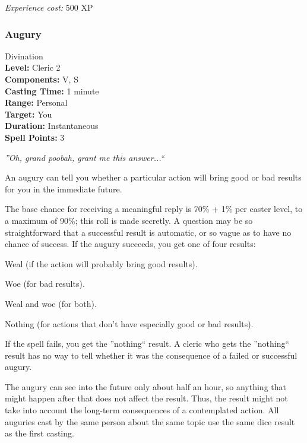 \emph{Experience cost:} 500 XP
\subsubsection{Augury}
\label{Spell:Augury}
Divination
\\ \textbf{Level:} Cleric 2
\\ \textbf{Components:} V, S
\\ \textbf{Casting Time:} 1 minute
\\ \textbf{Range:} Personal
\\ \textbf{Target:} You
\\ \textbf{Duration:} Instantaneous
\\ \textbf{Spell Points:} 3

\emph{''Oh, grand poobah, grant me this answer...``}

An augury can tell you whether a particular action will bring good or bad results for you in the immediate future.

The base chance for receiving a meaningful reply is 70\% + 1\% per caster level, to a maximum of 90\%; this roll is made secretly. 
A question may be so straightforward that a successful result is automatic, or so vague as to have no chance of success. 
If the augury succeeds, you get one of four results:

\begin{list}{}{\leftmargin=1em}
 \item Weal (if the action will probably bring good results).
 \item Woe (for bad results).
 \item Weal and woe (for both).
 \item Nothing (for actions that don't have especially good or bad results).
\end{list}
If the spell fails, you get the ''nothing`` result. A cleric who gets the ''nothing`` result has no way to tell whether it was the consequence of a failed or successful augury.

The augury can see into the future only about half an hour, so anything that might happen after that does not affect the result. 
Thus, the result might not take into account the long-term consequences of a contemplated action. 
All auguries cast by the same person about the same topic use the same dice result as the first casting.

